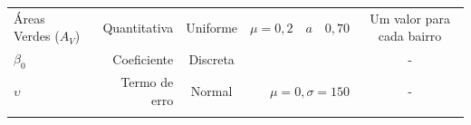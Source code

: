 \documentclass[
  a4paper, 11pt]{article}
\begin{document}
\begin{longtable}[]{@{}lrcrc@{}}
\begin{minipage}[t]{0.18\columnwidth}\raggedright
Áreas Verdes (\(A_V\))\strut
\end{minipage} & \begin{minipage}[t]{0.12\columnwidth}\raggedleft
Quantitativa\strut
\end{minipage} & \begin{minipage}[t]{0.11\columnwidth}\centering
Uniforme\strut
\end{minipage} & \begin{minipage}[t]{0.25\columnwidth}\raggedleft
\(\mu = 0,2 \quad a \quad 0,70\)\strut
\end{minipage} & \begin{minipage}[t]{0.21\columnwidth}\centering
Um valor para cada bairro\strut
\end{minipage}\tabularnewline
\begin{minipage}[t]{0.18\columnwidth}\raggedright
\(\beta_{0}\)\strut
\end{minipage} & \begin{minipage}[t]{0.12\columnwidth}\raggedleft
Coeficiente\strut
\end{minipage} & \begin{minipage}[t]{0.11\columnwidth}\centering
Discreta\strut
\end{minipage} & \begin{minipage}[t]{0.25\columnwidth}\raggedleft
2000\strut
\end{minipage} & \begin{minipage}[t]{0.21\columnwidth}\centering
-\strut
\end{minipage}\tabularnewline
\begin{minipage}[t]{0.18\columnwidth}\raggedright
\(\upsilon\)\strut
\end{minipage} & \begin{minipage}[t]{0.12\columnwidth}\raggedleft
Termo de erro\strut
\end{minipage} & \begin{minipage}[t]{0.11\columnwidth}\centering
Normal\strut
\end{minipage} & \begin{minipage}[t]{0.25\columnwidth}\raggedleft
\(\mu = 0, \sigma = 150\)\strut
\end{minipage} & \begin{minipage}[t]{0.21\columnwidth}\centering
-\strut
\end{minipage}\tabularnewline
\begin{minipage}[t]{0.18\columnwidth}\raggedright

\end{minipage}
\end{longtable}
\end{document}
